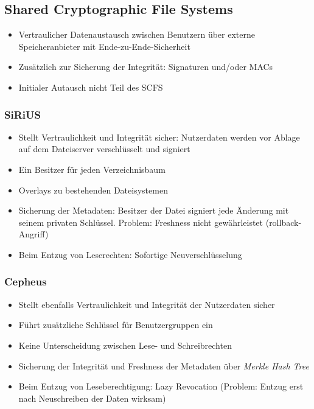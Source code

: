 \subsection{Shared Cryptographic File Systems}
\begin{itemize}
	\item Vertraulicher Datenaustausch zwischen Benutzern über externe Speicheranbieter mit Ende-zu-Ende-Sicherheit
	\item Zusätzlich zur Sicherung der Integrität: Signaturen und/oder MACs
	\item Initialer Autausch nicht Teil des SCFS
\end{itemize}

\subsubsection{SiRiUS}
\begin{itemize}
	\item Stellt Vertraulichkeit und Integrität sicher: Nutzerdaten werden vor Ablage auf dem Dateiserver verschlüsselt und signiert
	\item Ein Besitzer für jeden Verzeichnisbaum
	\item Overlays zu bestehenden Dateisystemen
	\item Sicherung der Metadaten: Besitzer der Datei signiert jede Änderung mit seinem privaten Schlüssel. Problem: Freshness nicht gewährleistet (rollback-Angriff)
	\item Beim Entzug von Leserechten: Sofortige Neuverschlüsselung
\end{itemize}

\subsubsection{Cepheus}
\begin{itemize}
	\item Stellt ebenfalls Vertraulichkeit und Integrität der Nutzerdaten sicher
	\item Führt zusätzliche Schlüssel für Benutzergruppen ein
	\item Keine Unterscheidung zwischen Lese- und Schreibrechten
	\item Sicherung der Integrität und Freshness der Metadaten über \textit{Merkle Hash Tree}
	\item Beim Entzug von Leseberechtigung: Lazy Revocation (Problem: Entzug erst nach Neuschreiben der Daten wirksam)
\end{itemize}

